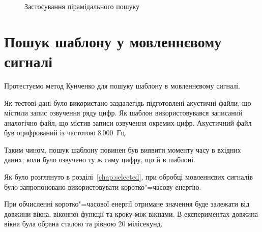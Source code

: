 \begin{figure}[h]

        \caption{Застосування пірамідального пошуку}
        \label{fig:simple-signal-kun-p}
    \end{figure}
    \clearpage

\section{Пошук шаблону у мовленнєвому сигналі}
    Протестуємо метод Кунченко для пошуку шаблону в мовленнєвому сигналі.

    Як тестові дані було використано заздалегідь підготовлені акустичні файли, що містили запис озвучення ряду цифр.
    Як шаблон використовувався записаний аналогічно файл, що містив записи озвучення окремих цифр.
    Акустичний файл був оцифрований із частотою 8\,000~Гц.

    Таким чином, пошук шаблону повинен був виявити моменту часу в вхідних даних, коли було озвучено ту ж саму цифру,
    що й в шаблоні.

    Як було розглянуто в розділі~\ref{chap:selected}, при обробці мовленнєвих сигналів було запропоновано
    використовувати коротко"=часову енергію.

    При обчисленні коротко"=часової енергії отримане значення буде залежати від довжини вікна, віконної функції та
    кроку між вікнами.
    В експериментах довжина вікна була обрана сталою та рівною 20 мілісекунд.

